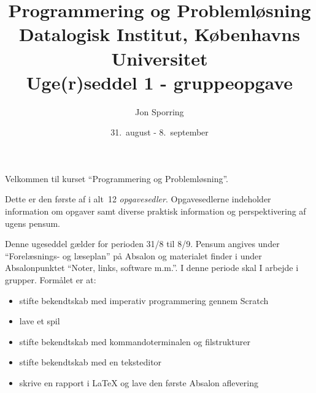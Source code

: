 \documentclass[a4paper,12pt]{article}
\title{Programmering og Problemløsning\\Datalogisk Institut,
  Københavns Universitet\\Uge(r)seddel 1 - gruppeopgave}
\author{Jon Sporring}
\date{31.\ august - 8.\ september}
\begin{document}
\maketitle

Velkommen til kurset ``Programmering og Problemløsning''.

Dette er den første af i alt~12 \emph{opgavesedler}. Opgavesedlerne indeholder information om opgaver samt diverse praktisk information og perspektivering af ugens pensum.

Denne ugeseddel gælder for perioden 31/8 til 8/9. Pensum angives under
"`Forelæsnings- og læseplan"' på Absalon og materialet finder i under
Absalonpunktet "`Noter, links, software m.m."'.  I denne periode skal
I arbejde i grupper. Formålet er at:
\begin{itemize}
\item stifte bekendtskab med imperativ programmering gennem Scratch
\item lave et spil
\item stifte bekendtskab med kommandoterminalen og filstrukturer
\item stifte bekendtskab med en teksteditor
\item skrive en rapport i LaTeX og lave den første Absalon aflevering
\end{itemize}
\end{document}
